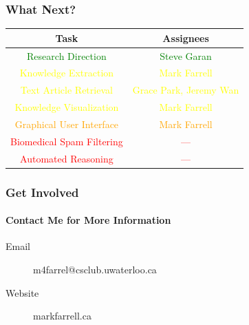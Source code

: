 \documentclass[mathserif]{beamer}
\begin{document}
\begin{frame}

\frametitle{What Next?}

\centering

\begin{tabular}{c | c}
Task &  Assignees\\
\hline
\textcolor{green}{Research Direction} & \textcolor{green}{Steve Garan} \\
\textcolor{yellow}{Knowledge Extraction} & \textcolor{yellow}{Mark Farrell} \\
\textcolor{yellow}{Text Article Retrieval} & \textcolor{yellow}{Grace Park, Jeremy Wan} \\
\textcolor{yellow}{Knowledge Visualization} & \textcolor{yellow}{Mark Farrell} \\
\textcolor{orange}{Graphical User Interface} & \textcolor{orange}{Mark Farrell} \\
\textcolor{red}{Biomedical Spam Filtering} & \textcolor{red}{---} \\
\textcolor{red}{Automated Reasoning} & \textcolor{red}{---} \\
\end{tabular}






\end{frame}

\begin{frame}

\frametitle{Get Involved}
\framesubtitle{Contact Me for More Information}

\begin{description}
\item[Email] m4farrel@csclub.uwaterloo.ca
\item[Website] markfarrell.ca
\end{description}

\end{frame}
\end{document}
